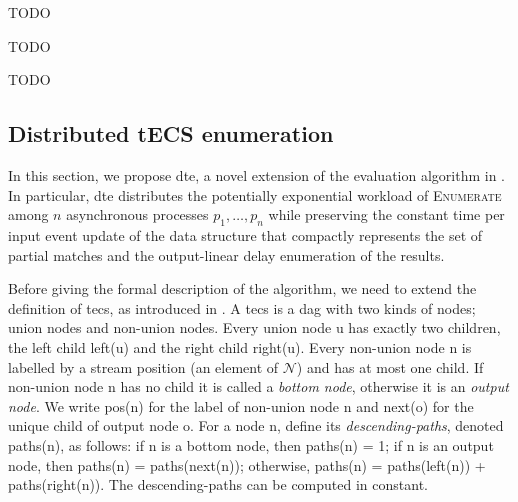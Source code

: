 
\begin{lemma}[TODO]
  \label{lemma:todo}
  TODO
\end{lemma}

\begin{theorem}[TODO]
  \label{theorem:todo}
  TODO
\end{theorem}

\begin{example}[TODO]
  \label{example:todo}
  TODO
\end{example}

%
%


\subsection{Distributed tECS enumeration}\label{subsec:distributed_tecs_enumeration}

In this section, we propose \acrfull{dte}, a novel extension of the evaluation algorithm in \cite{core}. In particular, \acrshort{dte} distributes the potentially exponential workload of \textsc{Enumerate} among $n$ asynchronous processes $p_{1}, \ldots, p_{n}$ while preserving the constant time per input event update of the data structure that compactly represents the set of partial matches and the output-linear delay enumeration of the results.

Before giving the formal description of the algorithm, we need to extend the definition of \acrfull{tecs}, as introduced in \cite{core}. A \acrshort{tecs} is a \acrfull{dag} \tecs with two kinds of nodes; union nodes and non-union nodes. Every union node u has exactly two children, the left child left(u) and the right child right(u). Every non-union node n is labelled by a stream position (an element of $\mathcal{N}$) and has at most one child. If non-union node n has no child it is called a \emph{bottom node}, otherwise it is an \emph{output node}. We write pos(n) for the label of non-union node n and next(o) for the unique child of output node o. For a node n, define its \emph{descending-paths}, denoted paths(n), as follows: if n is a bottom node, then paths(n) = 1; if n is an output node, then paths(n) = paths(next(n)); otherwise, paths(n) = paths(left(n)) + paths(right(n)). The descending-paths can be computed in constant.

